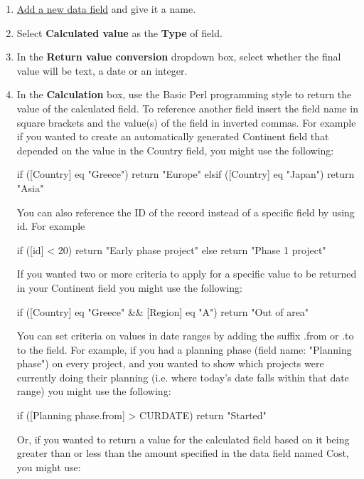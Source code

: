 \documentclass{ctrlo-int-toc}
\begin{document}
\begin{admin}
\begin{enumerate}
\item \hyperref[subsec:addfield]{Add a new data field} and give it a name. 
\item Select \textbf{Calculated value} as the \textbf{Type} of field. 
\item In the \textbf{Return value conversion} dropdown box, select whether the final value will be text, a date or an integer. 
\item In the \textbf{Calculation} box, use the Basic Perl programming style to return the value of the calculated field. To reference another field insert the field name in square brackets and the value(s) of the field in inverted commas. For example if you wanted to create an automatically generated Continent field that depended on the value in the Country field, you might use the following:

\begin{code}
if ([Country] eq "Greece") {
    return "Europe"
} elsif ([Country] eq "Japan") {
    return "Asia"
}
\end{code}

You can also reference the ID of the record instead of a specific field by using id. For example

\begin{code}
if ([id] < 20) {
    return "Early phase project"
} else {
    return "Phase 1 project"
}
\end{code}

If you wanted two or more criteria to apply for a specific value to be returned in your Continent field you might use the following:

\begin{code}
if ([Country] eq "Greece" && [Region] eq "A") {
    return "Out of area"
}
\end{code}

You can set criteria on values in date ranges by adding the suffix {\textquotedbl}.from{\textquotedbl} or {\textquotedbl}.to{\textquotedbl} to the field. For example, if you had a planning phase (field name: "Planning phase") on every project, and you wanted to show which projects were currently doing their planning (i.e. where today's date falls within that date range) you might use the following:

\begin{code}
if ([Planning phase.from] > CURDATE) {
    return "Started"
}
\end{code}

Or, if you wanted to return a value for the calculated field based on it being greater than or less than the amount specified in the data field named Cost, you might use: 


\end{enumerate}
\end{admin}
\end{document}
